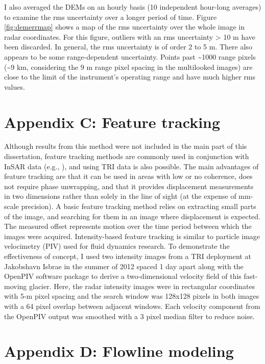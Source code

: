 I also averaged the DEMs on an hourly basis (10 independent hour-long averages) to examine the rms uncertainty over a longer period of time. Figure \ref{fig:demerrmap} shows a map of the rms uncertainty over the whole image in radar coordinates. For this figure, outliers with an rms uncertainty > 10 m have been discarded. In general, the rms uncertainty is of order 2 to 5 m. There also appears to be some range-dependent uncertainty. Points past \textasciitilde1000 range pixels (\textasciitilde9 km, considering the 9 m range pixel spacing in the multilooked images) are close to the limit of the instrument's operating range and have much higher rms values.


\newpage
\section*{Appendix C: Feature tracking}

Although results from this method were not included in the main part of this dissertation, feature tracking methods are commonly used in conjunction with InSAR data (e.g., \citet{joughin2004large}), and using TRI data is also possible. The main advantages of feature tracking are that it can be used in areas with low or no coherence, does not require phase unwrapping, and that it provides displacement measurements in two dimensions rather than solely in the line of sight (at the expense of mm-scale precision). A basic feature tracking method relies on extracting small parts of the image, and searching for them in an image where displacement is expected. The measured offset represents motion over the time period between which the images were acquired. 
Intensity-based feature tracking is similar to particle image velocimetry (PIV) used for fluid dynamics research. To demonstrate the effectiveness of concept, I used two intensity images from a TRI deployment at Jakobshavn Isbrae in the summer of 2012 spaced 1 day apart along with the OpenPIV software package \citep{openpiv} to derive a two-dimensional velocity field of this fast-moving glacier. Here, the radar intensity images were in rectangular coordinates with 5-m pixel spacing and the search window was 128x128 pixels in both images with a 64 pixel overlap between adjacent windows. Each velocity component from the OpenPIV output was smoothed with a 3 pixel median filter to reduce noise. 

\newpage
\section*{Appendix D: Flowline modeling}

